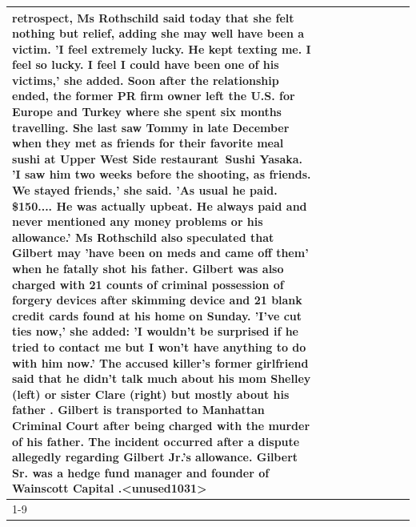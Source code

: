 \begin{table}[H]
\begin{tabular}{lllrlllll}
retrospect, Ms Rothschild said today that she felt nothing but relief, adding she may well have been a victim. 'I feel extremely lucky. He kept texting me. I feel so lucky. I feel I could have been one of his victims,' she added. Soon after the relationship ended, the former PR firm owner left the U.S. for Europe and Turkey where she spent six months  travelling. She last saw Tommy in late December when they met as friends for their favorite meal sushi at Upper West Side restaurant Sushi Yasaka. 'I saw him two weeks before the shooting, as friends. We stayed friends,' she said. 'As usual he paid. \$150.... He was actually upbeat. He always paid and never mentioned any money problems or his allowance.' Ms Rothschild also speculated that Gilbert may 'have been on meds and came off them' when he fatally shot his father. Gilbert was also charged with 21 counts of criminal possession of forgery devices after skimming device and 21 blank credit cards found at his home on Sunday. 'I've cut ties now,' she added: 'I wouldn’t be surprised if he tried to contact me but I won’t have anything to do with him now.' The accused killer's former girlfriend said that he didn't talk much about his mom Shelley (left) or sister Clare (right) but mostly about his father . Gilbert is transported to Manhattan Criminal Court  after being charged with the murder of his father. The incident occurred after a dispute allegedly regarding Gilbert Jr.'s allowance. Gilbert Sr. was a hedge fund manager and founder of Wainscott Capital .<unused1031> \\
\cline{1-9} \cline{2-9}

\end{tabular}
\end{table}
